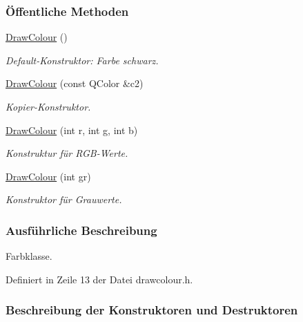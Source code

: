 \subsubsection*{Öffentliche Methoden}
\begin{DoxyCompactItemize}
\item 
\mbox{\hyperlink{classDrawColour_a90d4f5a402f7d5713bde68577a117622}{Draw\+Colour}} ()
\begin{DoxyCompactList}\small\item\em Default-\/\+Konstruktor\+: Farbe schwarz. \end{DoxyCompactList}\item 
\mbox{\hyperlink{classDrawColour_a1c59565e58972adcf8c7d4039dcfba12}{Draw\+Colour}} (const Q\+Color \&c2)
\begin{DoxyCompactList}\small\item\em Kopier-\/\+Konstruktor. \end{DoxyCompactList}\item 
\mbox{\hyperlink{classDrawColour_ae1e915e236c257088107e4aeffabfbbb}{Draw\+Colour}} (int r, int g, int b)
\begin{DoxyCompactList}\small\item\em Konstruktur für R\+G\+B-\/\+Werte. \end{DoxyCompactList}\item 
\mbox{\hyperlink{classDrawColour_a723a3d63cba2d7cb7438e9080233b3fd}{Draw\+Colour}} (int gr)
\begin{DoxyCompactList}\small\item\em Konstruktor für Grauwerte. \end{DoxyCompactList}\end{DoxyCompactItemize}


\subsubsection{Ausführliche Beschreibung}
Farbklasse. 

Definiert in Zeile 13 der Datei drawcolour.\+h.



\subsubsection{Beschreibung der Konstruktoren und Destruktoren}
\mbox{\label{classDrawColour_a90d4f5a402f7d5713bde68577a117622}} 
